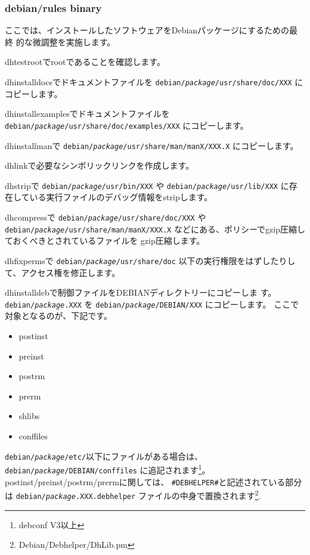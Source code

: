\documentclass[mingoth,a4paper]{jsarticle}
\begin{document}
\subsubsection{debian/rules binary}

ここでは、インストールしたソフトウェアをDebianパッケージにするための最終
的な微調整を実施します。

dh\underbar{ }testrootでrootであることを確認します。

dh\underbar{ }installdocsでドキュメントファイルを
{\tt debian/{\it package}/usr/share/doc/XXX}
にコピーします。

dh\underbar{ }installexamplesでドキュメントファイルを
{\tt debian/{\it package}/usr/share/doc/examples/XXX}
にコピーします。

dh\underbar{ }installmanで
{\tt debian/{\it package}/usr/share/man/manX/XXX.X}
にコピーします。

dh\underbar{ }linkで必要なシンボリックリンクを作成します。

dh\underbar{ }stripで
{\tt debian/{\it package}/usr/bin/XXX}
や
{\tt debian/{\it package}/usr/lib/XXX}
に存在している実行ファイルのデバッグ情報をstripします。

dh\underbar{ }compressで
{\tt debian/{\it package}/usr/share/doc/XXX}
や
{\tt debian/{\it package}/usr/share/man/manX/XXX.X}
などにある、ポリシーでgzip圧縮しておくべきとされているファイルを
gzip圧縮します。

dh\underbar{ }fixpermsで
{\tt debian/{\it package}/usr/share/doc}
以下の実行権限をはずしたりして、アクセス権を修正します。

dh\underbar{ }installdebで制御ファイルをDEBIANディレクトリーにコピーしま
す。
{\tt debian/{\it package}.XXX}
を
{\tt debian/{\it package}/DEBIAN/XXX}
にコピーします。
ここで対象となるのが、下記です。
\begin{itemize}
 \item postinst
 \item preinst
 \item postrm
 \item prerm
 \item shlibs
 \item conffiles
\end{itemize}
{\tt debian/{\it package}/etc/}以下にファイルがある場合は、
{\tt debian/{\it package}/DEBIAN/conffiles}
に追記されます\footnote{debconf V3以上}。
postinst/preinst/postrm/prermに関しては、
\verb!#DEBHELPER#!と記述されている部分は
{\tt debian/{\it package}.XXX.debhelper}
ファイルの中身で置換されます\footnote{Debian/Debhelper/Dh\underbar{ }Lib.pm}.
\end{document}

